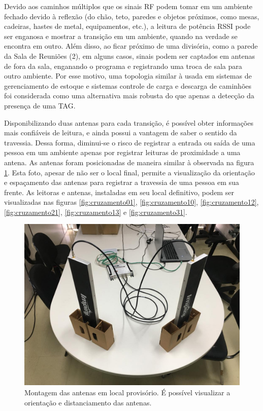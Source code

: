  Devido aos caminhos múltiplos que os sinais RF podem tomar em um ambiente fechado devido à reflexão (do chão, teto, paredes e objetos próximos, como mesas, cadeiras, hastes de metal, equipamentos, etc.), a leitura de potência RSSI pode ser enganosa e mostrar a transição em um ambiente, quando na verdade se encontra em outro. Além disso, ao ficar próximo de uma divisória, como a parede da Sala de Reuniões (2), em alguns casos, sinais podem ser captados em antenas de fora da sala, enganando o programa e registrando uma troca de sala para outro ambiente. Por esse motivo, uma topologia similar à usada em sistemas de gerenciamento de estoque e sistemas  controle de carga e descarga de caminhões \cite{PortalRFID} foi considerada como uma alternativa mais robusta do que apenas a detecção da presença de uma TAG.
 
 Disponibilizando duas antenas para cada transição, é possível obter informações mais confiáveis de leitura, e ainda possui a vantagem de saber o sentido da travessia. Dessa forma, diminui-se o risco de registrar a entrada ou saída de uma pessoa em um ambiente apenas por registrar leituras de proximidade a uma antena. As antenas foram posicionadas de maneira similar à observada na figura \ref{fig:antenas1}. Esta foto, apesar de não ser o local final, permite a visualização da orientação e espaçamento das antenas para registrar a travessia de uma pessoa em sua frente. As leitoras e antenas, instaladas em seu local definitivo, podem ser visualizadas nas figuras \ref{fig:cruzamento01}, \ref{fig:cruzamento10}, \ref{fig:cruzamento12}, \ref{fig:cruzamento21}, \ref{fig:cruzamento13} e \ref{fig:cruzamento31}.
 
  \begin{figure}[H]
    \centering
    \includegraphics[width=0.6\linewidth]{figs/Metodologia/antenas1.jpeg}
    \caption{Montagem das antenas em local provisório. É possível visualizar a orientação e distanciamento das antenas.}
    \label{fig:antenas1}
\end{figure}
 
